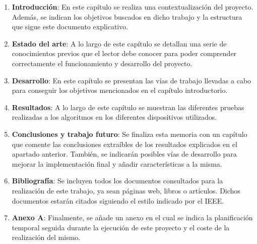 \begin{enumerate}
    \item \textbf{Introducción}: En este capítulo se realiza una contextualización del proyecto. Además, se indican los objetivos buscados en dicho trabajo y la estructura que sigue este documento explicativo.
    \item \textbf{Estado del arte}: A lo largo de este capítulo se detallan una serie de conocimientos previos que el lector debe conocer para poder comprender correctamente el funcionamiento y desarrollo del proyecto.
    \item \textbf{Desarrollo}: En este capítulo se presentan las vías de trabajo llevadas a cabo para conseguir los objetivos mencionados en el capítulo introductorio.
    \item \textbf{Resultados}: A lo largo de este capítulo se muestran las diferentes pruebas realizadas a los algoritmos en los diferentes dispositivos utilizados.
    \item \textbf{Conclusiones y trabajo futuro}: Se finaliza esta memoria con un capítulo que comente las conclusiones extraíbles de los resultados explicados en el apartado anterior. También, se indicarán posibles vías de desarrollo para mejorar la implementación final y añadir características a la misma.
    \item \textbf{Bibliografía}: Se incluyen todos los documentos consultados para la realización de este trabajo, ya sean páginas web, libros o artículos. Dichos documentos estarán citados siguiendo el estilo indicado por el \ac{IEEE}.
    \item \textbf{Anexo A}: Finalmente, se añade un anexo en el cual se indica la planificación temporal seguida durante la ejecución de este proyecto y el coste de la realización del mismo.
\end{enumerate}





